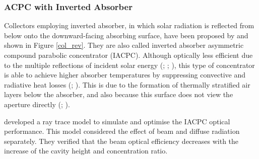 
\subsubsection{ACPC with Inverted Absorber}

Collectors employing inverted absorber, in which solar radiation is reflected from below onto the downward-facing absorbing surface, have been proposed by \citet{Rabl1976} and shown in Figure \ref{col_rev}. They are also called inverted absorber asymmetric compound parabolic concentrator (IACPC). Although optically less efficient due to the multiple reflections of incident solar energy (\cite{Eames1996}; \cite{Kothdiwala1996}; \cite{Shams2013}), this type of concentrator is able to achieve higher absorber temperatures by suppressing convective and radiative heat losses (\cite{Kothdiwala1997}; \cite{Kothdiwala1999}). This is due to the formation of thermally stratified air layers below the absorber, and also because this surface does not view the aperture directly (\cite{Kienzlen1988}; \cite{Eames2001}).


\citet{Kothdiwala1996} developed a ray trace model to simulate and optimise the IACPC optical performance. This model considered the effect of beam and diffuse radiation separately. They verified that the beam optical efficiency decreases with the increase of the cavity height and concentration ratio. %


